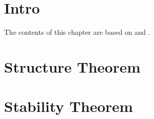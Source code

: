 \section{Intro}
The contents of this chapter are based on \cite{nanda} and \cite{polterovich}.

\section{Structure Theorem}

\section{Stability Theorem}